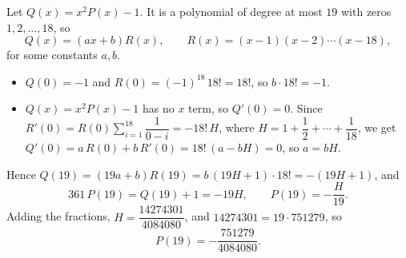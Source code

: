 Let $Q(x)=x^2P(x)-1$. It is a polynomial of degree at most $19$ with zeros $1,2,\dots,18$, so
\[
Q(x)=(ax+b)R(x),\qquad R(x)=(x-1)(x-2)\cdots(x-18),
\]
for some constants $a,b$.
\begin{itemize}
\item $Q(0)=-1$ and $R(0)=(-1)^{18}\,18!=18!$, so $b\cdot18!=-1$.
\item $Q(x)=x^2P(x)-1$ has no $x$ term, so $Q'(0)=0$. Since $R'(0)=R(0)\displaystyle\sum_{i=1}^{18}\dfrac{1}{0-i}=-18!\,H$, where $H=1+\dfrac{1}{2}+\cdots+\dfrac{1}{18}$, we get $Q'(0)=a\,R(0)+b\,R'(0)=18!\,(a-bH)=0$, so $a=bH$.
\end{itemize}
Hence $Q(19)=(19a+b)R(19)=b\,(19H+1)\cdot18!=-(19H+1)$, and
\[
361\,P(19)=Q(19)+1=-19H,\qquad P(19)=-\dfrac{H}{19}.
\]
Adding the fractions, $H=\dfrac{14274301}{4084080}$, and $14274301=19\cdot751279$, so
\[
P(19)=\boxed{-\dfrac{751279}{4084080}} .
\]
